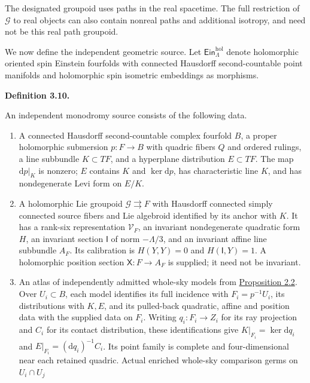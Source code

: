 \documentclass[
  english,
  11pt,
  reqno]{amsart}
\makeatletter
\newcommand{\pandocstatementheading}[1]{%
  \par\addpenalty{\@beginparpenalty}%
  \addvspace{.5\baselineskip plus .2\baselineskip minus .2\baselineskip}%
  {\normalfont\bfseries #1\par}%
  \nobreak\@afterindenttrue\@afterheading
}
\makeatother
\begin{document}
The designated groupoid uses paths in the real spacetime. The full
restriction of \(\mathcal G\) to real objects can also contain nonreal
paths and additional isotropy, and need not be this real path groupoid.

We now define the independent geometric source. Let
\(\mathsf{Ein}^{\mathrm{hol}}_\Lambda\) denote holomorphic oriented spin
Einstein fourfolds with connected Hausdorff second-countable point
manifolds and holomorphic spin isometric embeddings as morphisms.

\pandocstatementheading{\protect{}\label{def:independent-monodromy-source-v092}Definition 3.10.}

An independent monodromy source consists of the following data.

\begin{enumerate}
\item
  A connected Hausdorff second-countable complex fourfold \(B\), a
  proper holomorphic submersion \(p:F\to B\) with quadric fibers \(Q\)
  and ordered rulings, a line subbundle \(K\subset TF\), and a
  hyperplane distribution \(E\subset TF\). The map \(\mathrm dp|_K\) is
  nonzero; \(E\) contains \(K\) and \(\ker\mathrm dp\), has
  characteristic line \(K\), and has nondegenerate Levi form on \(E/K\).
\item
  A holomorphic Lie groupoid \(\mathcal G\rightrightarrows F\) with
  Hausdorff connected simply connected source fibers and Lie algebroid
  identified by its anchor with \(K\). It has a rank-six representation
  \(\mathcal V_F\), an invariant nondegenerate quadratic form \(H\), an
  invariant section \(\mathsf I\) of norm \(-\Lambda/3\), and an
  invariant affine line subbundle \(A_F\). Its calibration is
  \(H(Y,Y)=0\) and \(H(\mathsf I,Y)=1\). A holomorphic position section
  \(\mathsf X:F\to A_F\) is supplied; it need not be invariant.
\item
  An atlas of independently admitted whole-sky models from
  \hyperref[prop:independent-local-ray-recognition-v09]{Proposition
  2.2}. Over \(U_i\subset B\), each model identifies its full incidence
  with \(F_i=p^{-1}U_i\), its distributions with \(K,E\), and its
  pulled-back quadratic, affine and position data with the supplied data
  on \(F_i\). Writing \(q_i:F_i\to Z_i\) for its ray projection and
  \(C_i\) for its contact distribution, these identifications give
  \(K|_{F_i}=\ker\mathrm dq_i\) and \(E|_{F_i}=(\mathrm dq_i)^{-1}C_i\).
  Its point family is complete and four-dimensional near each retained
  quadric. Actual enriched whole-sky comparison germs on \(U_i\cap U_j\)

\end{enumerate}
\end{document}
